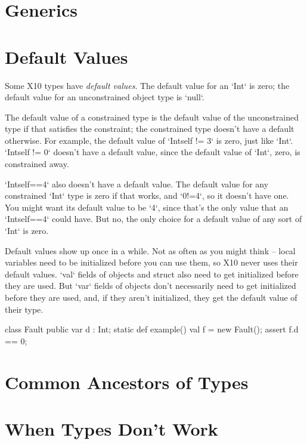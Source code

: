 \section{Generics}

\section{Default Values}
\label{sect:DefaultValues}

Some X10 types have {\em default values}.  The default value for an \xcd`Int`
is zero; the default value for an unconstrained object type is \xcd`null`.  


The default value of a constrained type is the default value of the
unconstrained type if that satisfies the constraint; the constrained type
doesn't have a default otherwise. 
For example, the default value of \xcd`Int{self != 3}` is zero, just like
\xcd`Int`.  \xcd`Int{self != 0}` doesn't have a default value, since the
default value of \xcd`Int`, zero, is constrained away. 

\xcd`Int{self==4}` also doesn't have a default value.  The default value for
any constrained \xcd`Int` type is zero if that works, and \xcd`0!=4`, so it
doesn't have one.  You might want its default value to be \xcd`4`, since
that's the only value that an \xcd`Int{self==4}` could have. But no, the
only choice for a default value of any sort of \xcd`Int` is zero.


Default values show up once in a while.  Not as often as you might think --
local variables need to be initialized before you can use them, so X10 never
uses their default values.  \xcd`val` fields of objects and struct also need
to get initialized before they are used.  But \xcd`var` fields of objects
don't necessarily need to get initialized before they are used, and, if they
aren't initialized, they get the default value of their type.


\begin{xtennum}[]
 class Fault {
  public var d : Int;
  static def example() {
    val f = new Fault();
    assert f.d == 0; 
  }
}
\end{xtennum}




\section{Common Ancestors of Types}
\section{When Types Don't Work}

